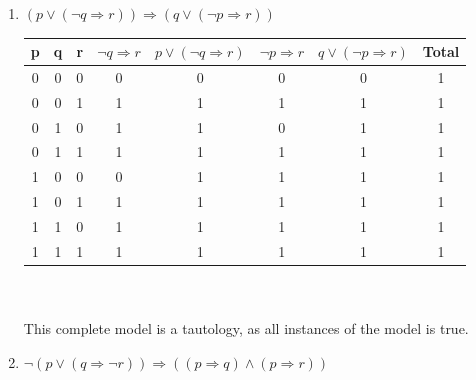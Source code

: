 \begin{large}
\begin{enumerate}[label=(\alph*)]
    \item $ (p \lor(\neg q \Rightarrow r)) \Rightarrow (q \lor (\neg p \Rightarrow r)) $

          \begin{tabular}{c|c|c|c|c|c|c||c}
            p & q & r & $ \neg q \Rightarrow r $ & $ p \lor (\neg q \Rightarrow r) $ & $ \neg p \Rightarrow r $ & $ q \lor (\neg p \Rightarrow r) $ & Total \\
            \hline\hline
            0 & 0 & 0 & 0                        & 0                                 & 0                        & 0                                 & 1     \\
            \hline
            0 & 0 & 1 & 1                        & 1                                 & 1                        & 1                                 & 1     \\
            \hline
            0 & 1 & 0 & 1                        & 1                                 & 0                        & 1                                 & 1     \\
            \hline
            0 & 1 & 1 & 1                        & 1                                 & 1                        & 1                                 & 1     \\
            \hline
            1 & 0 & 0 & 0                        & 1                                 & 1                        & 1                                 & 1     \\
            \hline
            1 & 0 & 1 & 1                        & 1                                 & 1                        & 1                                 & 1     \\
            \hline
            1 & 1 & 0 & 1                        & 1                                 & 1                        & 1                                 & 1     \\
            \hline
            1 & 1 & 1 & 1                        & 1                                 & 1                        & 1                                 & 1     \\
            \hline
          \end{tabular}
          \\ \\
          This complete model is a tautology, as all instances of the model is true.

    \item $ \neg(p \lor( q \Rightarrow \neg r)) \Rightarrow (( p \Rightarrow  q) \land ( p \Rightarrow  r)) $


\end{enumerate}
\end{large}

